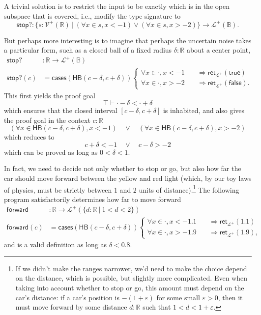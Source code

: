 \documentclass{article}           %
\newcommand{\R}{\mathbb{R}}
\newcommand{\suchthat}{\ |\ }
\newcommand{\bool}{\mathbb{B}}
\newcommand{\PLower}{\mathcal{L}^+}
\newcommand{\Viet}{{\mathcal{V}^+}}
\newcommand{\ret}[1]{\mathsf{ret}_{#1}}
\newcommand{\HeineBorel}{\mathsf{HB}}
\begin{document}
A trivial solution is to restrict the input to be exactly which is in the open subspace that is covered, i.e., modify the type signature to
\[
\mathsf{stop?} : \{ s : \Viet(\R) \suchthat 
 \left(\forall x \in s, x < -1 \right) \vee \left(\forall x \in s, x > -2 \right)
 \} \to \PLower(\bool).
\]

But perhaps more interesting is to imagine that perhaps the uncertain noise takes a particular form, such as a closed ball of a fixed radius $\delta : \R$ about a center point,
\begin{align*}
\mathsf{stop?} &: \R \to \PLower(\bool)
\\ \mathsf{stop?}(c) &= \mathsf{cases}(\HeineBorel(c - \delta, c + \delta))
\begin{cases}
\forall x \in \cdot, x < -1
  \quad &\Longrightarrow
   \ret{\PLower} (\mathsf{true})
\\
\forall x \in \cdot, x > -2
  \quad &\Longrightarrow
   \ret{\PLower}(\mathsf{false}).
\end{cases}
\end{align*}
This first yields the proof goal
\[
\top \vdash \cdot - \delta < \cdot + \delta
\]
which ensures that the closed interval $[c - \delta, c + \delta]$ is inhabited, and also gives the proof goal in the context $c : \R$
\[
\left( \forall x \in \HeineBorel(c - \delta, c + \delta), x < -1 \right)
\quad \vee \quad
\left( \forall x \in \HeineBorel(c - \delta, c + \delta), x > -2 \right)
\]
which reduces to
\[
c + \delta < -1  \quad \vee \quad
c - \delta > - 2
\]
which can be proved as long as $0 < \delta < 1$.

In fact, we need to decide not only whether to stop or go, but also how far the car should move forward between the yellow and red light (which, by our toy laws of physics, must be strictly between 1 and 2 units of distance).\footnote{If we didn't make the ranges narrower, we'd need to make the choice depend on the distance, which is possible, but slightly more complicated. Even when taking into account whether to stop or go, this amount must depend on the car's distance: if a car's position is $-(1 + \varepsilon)$ for some small $\varepsilon > 0$, then it must move forward by some distance $d : \R$ such that $1 < d < 1 + \varepsilon$.} 
The following program satisfactorily determines how far to move forward
\begin{align*}
\mathsf{forward} &: \R \to \PLower(\{ d : \R \suchthat 1 < d < 2 \})
\\ \mathsf{forward}(c) &= \mathsf{cases}(\HeineBorel(c - \delta, c + \delta))
\begin{cases}
\forall x \in \cdot, x < -1.1
  \quad &\Longrightarrow
   \ret{\PLower}(1.1)
\\
\forall x \in \cdot, x > -1.9
  \quad &\Longrightarrow
   \ret{\PLower}(1.9),
\end{cases}
\end{align*}
and is a valid definition as long as $\delta < 0.8$.
\end{document}
